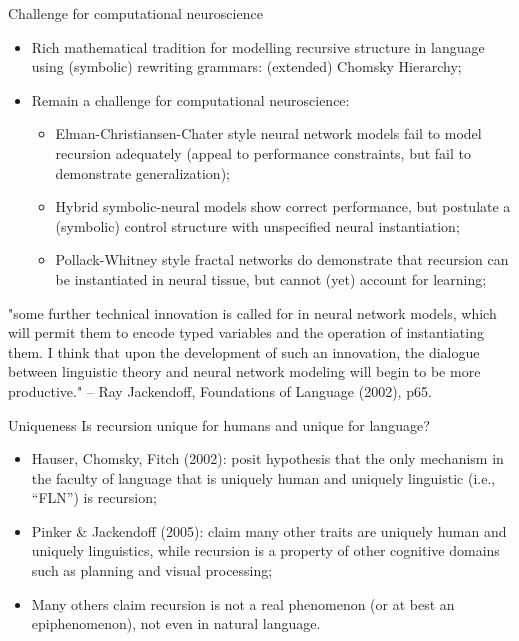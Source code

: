 \documentclass[xcolor=table,handout]{beamer}
\begin{document}
\begin{frame}{Challenge for computational neuroscience}
  \begin{itemize}
  \item Rich mathematical tradition for modelling recursive structure
    in language using (symbolic) rewriting grammars: (extended)
    Chomsky Hierarchy;
  \item Remain a challenge for computational neuroscience:
    \begin{itemize}
    \item Elman-Christiansen-Chater style neural network models fail
      to model recursion adequately (appeal to performance
      constraints, but fail to demonstrate generalization);
    \item Hybrid symbolic-neural models show correct performance, but
      postulate a (symbolic) control structure with unspecified neural
      instantiation;
    \item Pollack-Whitney style fractal networks do demonstrate that
      recursion can be instantiated in neural tissue, but cannot (yet)
      account for learning;
    \end{itemize}
  \end{itemize}
\end{frame}

\begin{frame}
  "some further technical innovation is called for in neural network
models, which will permit them to encode typed variables and the
operation of instantiating them. I think that upon the development of
such an innovation, the dialogue between linguistic theory and neural
network modeling will begin to be more productive." -- Ray Jackendoff,
Foundations of Language (2002), p65.
\end{frame}

\begin{frame}{Uniqueness}
  Is recursion unique for humans and unique for language?

  \begin{itemize}
  \item Hauser, Chomsky, Fitch (2002): posit hypothesis that the only
    mechanism in the faculty of language that is uniquely human and
    uniquely linguistic (i.e., ``FLN'') is recursion;
  \item Pinker \& Jackendoff (2005): claim many other traits are
    uniquely human and uniquely linguistics, while recursion is a
    property of other cognitive domains such as planning and visual
    processing;
  \item Many others claim recursion is not a real phenomenon (or at
    best an epiphenomenon), not even in natural language.
  \end{itemize}
\end{frame}
\end{document}
